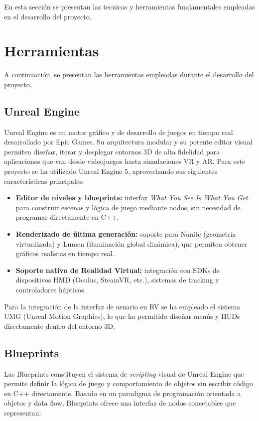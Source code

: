 
En esta sección se presentan las tecnicas y herramientas fundamentales empleadas en el desarrollo del proyecto.
\section{Herramientas}
A continuación, se presentan las herramientas empleadas durante el desarrollo del proyecto, 
\subsection{Unreal Engine}

Unreal Engine es un motor gráfico y de desarrollo de juegos en tiempo real desarrollado por Epic Games. Su arquitectura modular y su potente editor visual permiten diseñar, iterar y desplegar entornos 3D de alta fidelidad para aplicaciones que van desde videojuegos hasta simulaciones VR y AR. Para este proyecto se ha utilizado Unreal Engine 5, aprovechando sus siguientes características principales:

\begin{itemize}
  \item \textbf{Editor de niveles y blueprints:} interfaz  \textit{What You See Is What You Get} para construir escenas y lógica de juego mediante nodos, sin necesidad de programar directamente en C++.
  \item \textbf{Renderizado de última generación:} soporte para Nanite (geometría virtualizada) y Lumen (iluminación global dinámica), que permiten obtener gráficos realistas en tiempo real.
  \item \textbf{Soporte nativo de Realidad Virtual:} integración con SDKs de dispositivos HMD (Oculus, SteamVR, etc.), sistemas de tracking y controladores hápticos.
\end{itemize}

Para la integración de la interfaz de usuario en RV se ha empleado el sistema UMG (Unreal Motion Graphics), lo que ha permitido diseñar menús y HUDs directamente dentro del entorno 3D.

\subsection{Blueprints} 
Las Blueprints constituyen el sistema de \textit{scripting} visual de Unreal Engine que permite definir la lógica de juego y comportamiento de objetos sin escribir código en C++ directamente. Basado en un paradigma de programación orientada a objetos y data flow, Blueprints ofrece una interfaz de nodos conectables que representan:

